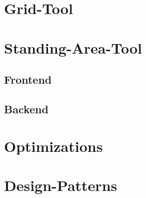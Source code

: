 \section{Grid-Tool}

\section{Standing-Area-Tool}

\subsection{Frontend}

\subsection{Backend}

\section{Optimizations}

\section{Design-Patterns}
